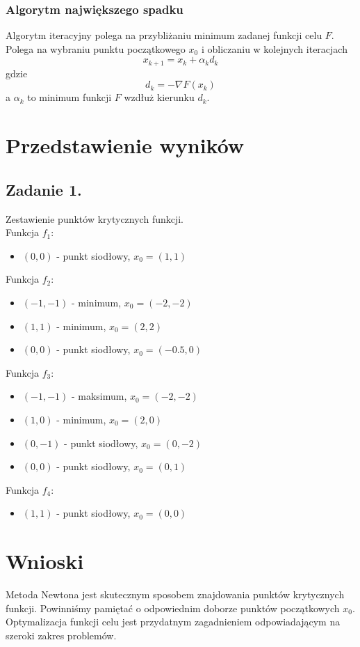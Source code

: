 \documentclass[11pt, leqno]{scrartcl}
\begin{document}
    \subsubsection{Algorytm największego spadku}
    Algorytm iteracyjny polega na przybliżaniu minimum zadanej
    funkcji celu $F$. Polega na wybraniu punktu początkowego
    $x_0$ i obliczaniu w kolejnych iteracjach
    \[
        x_{k+1}=x_k+\alpha _kd_k
    \]
    gdzie
    \[
        d_k=-\nabla F(x_k)
    \]
    a $\alpha _k$ to minimum funkcji $F$ wzdłuż kierunku $d_k$.

    \section{Przedstawienie wyników}
    \subsection{Zadanie 1.}
    Zestawienie punktów krytycznych funkcji. \\
    Funkcja $f_1$:
    \begin{itemize}
        \item $(0,0)$ - punkt siodłowy, $x_0=(1,1)$
    \end{itemize}
    Funkcja $f_2$:
    \begin{itemize}
        \item $(-1,-1)$ - minimum, $x_0=(-2,-2)$
        \item $(1,1)$ - minimum, $x_0=(2,2)$
        \item $(0,0)$ - punkt siodłowy, $x_0=(-0.5,0)$
    \end{itemize}
    Funkcja $f_3$:
    \begin{itemize}
        \item $(-1,-1)$ - maksimum, $x_0=(-2,-2)$
        \item $(1,0)$ - minimum, $x_0=(2,0)$
        \item $(0,-1)$ - punkt siodłowy, $x_0=(0,-2)$
        \item $(0,0)$ - punkt siodłowy, $x_0=(0,1)$
    \end{itemize}
    Funkcja $f_4$:
    \begin{itemize}
        \item $(1,1)$ - punkt siodłowy, $x_0=(0,0)$
    \end{itemize}

    \section{Wnioski}
    Metoda Newtona jest skutecznym sposobem znajdowania punktów
    krytycznych funkcji. Powinniśmy pamiętać o odpowiednim doborze
    punktów początkowych $x_0$. \\
    Optymalizacja funkcji celu jest przydatnym zagadnieniem
    odpowiadającym na szeroki zakres problemów.
\end{document}

